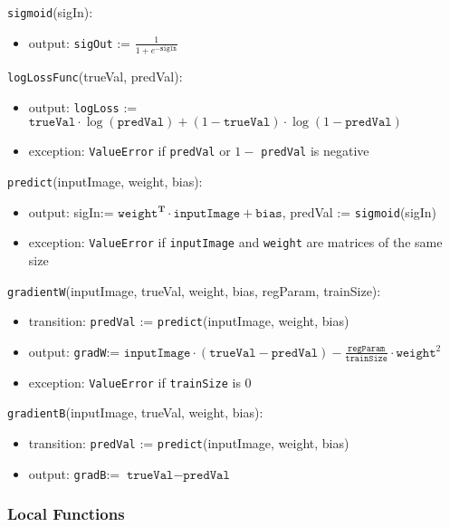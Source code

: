 \documentclass[12pt, titlepage]{article}
\def\code#1{\texttt{#1}}
\begin{document}
\noindent \code{sigmoid}(sigIn):
\begin{itemize}
\item output: \code{sigOut} := $\frac{1}{1 + e^{-\code{sigIn}}}$
\end{itemize}

\noindent \code{logLossFunc}(trueVal, predVal):
\begin{itemize}
\item output: \code{logLoss} := $\code{trueVal} \cdot \log(\code{predVal}) + (1 - \code{trueVal}) \cdot \log(1 - \code{predVal})$
\item exception: \code{ValueError} if \code{predVal} or $1 -$ \code{predVal} is negative
\end{itemize}

\noindent \code{predict}(inputImage, weight, bias):
\begin{itemize}
\item output: sigIn:= $\code{weight}^{\textbf{T}}\cdot\code{inputImage}+\code{bias}$, 
predVal := \code{sigmoid}(sigIn)
\item exception: \code{ValueError} if \code{inputImage} and \code{weight} are matrices of the same size
\end{itemize}

\noindent \code{gradientW}(inputImage, trueVal, weight, bias, regParam, trainSize):
\begin{itemize}
\item transition: \code{predVal} := \code{predict}(inputImage, weight, bias)
\item output: \code{gradW}:= $\code{inputImage}\cdot(\code{trueVal}-\code{predVal}) - \frac{\code{regParam}}{\code{trainSize}}\cdot\code{weight}^{2}$
\item exception: \code{ValueError} if \code{trainSize} is 0 
\end{itemize}

\noindent \code{gradientB}(inputImage, trueVal, weight, bias):
\begin{itemize}
  \item transition: \code{predVal} := \code{predict}(inputImage, weight, bias)
  \item output: \code{gradB}:= $\code{trueVal}-\code{predVal}$
\end{itemize}

\subsubsection{Local Functions}
\end{document}
